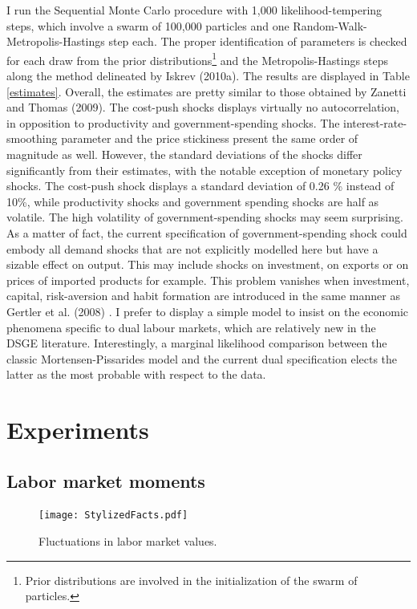 \documentclass[a4paper]{article}
\begin{document}
I run the Sequential Monte Carlo procedure with 1,000 likelihood-tempering steps, which involve a swarm of 100,000 particles and one Random-Walk-Metropolis-Hastings step each. The proper identification of parameters is checked for each draw from the prior distributions\footnote{Prior distributions are involved in the initialization of the swarm of particles.} and the Metropolis-Hastings steps along the method delineated by Iskrev (2010a). The results are displayed in Table \ref{estimates}. Overall, the estimates are pretty similar to those obtained by Zanetti and Thomas (2009). The cost-push shocks displays virtually no autocorrelation, in opposition to productivity and government-spending shocks. The interest-rate-smoothing parameter and the price stickiness present the same order of magnitude as well. However, the standard deviations of the shocks differ significantly from their estimates, with the notable exception of monetary policy shocks. The cost-push shock displays a standard deviation of 0.26 \% instead of 10\%, while productivity shocks and government spending shocks are half as volatile. The high volatility of government-spending shocks may seem surprising. As a matter of fact, the current specification of government-spending shock could embody all demand shocks that are not explicitly modelled here but have a sizable effect on output. This may include shocks on investment, on exports or on prices of imported products for example. This problem vanishes when investment, capital, risk-aversion and habit formation are introduced in the same manner as Gertler et al. (2008) \cite{gertler2008estimated}. I prefer to display a simple model to insist on the economic phenomena specific to dual labour markets, which are relatively new in the DSGE literature. Interestingly, a marginal likelihood comparison between the classic Mortensen-Pissarides model and the current dual specification elects the latter as the most probable with respect to the data.

\section{Experiments}

\subsection{Labor market moments}


\begin{figure}[t]
\texttt{[image: StylizedFacts.pdf]}
\caption{Fluctuations in labor market values.}
\label{fluctuations}
\end{figure}
\end{document}
